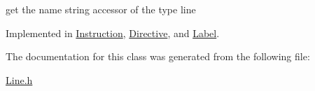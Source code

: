 get the name string accessor of the type line 



Implemented in \hyperlink{class_instruction_aed87de5e9259f4f15dc885425528f1fe}{Instruction}, \hyperlink{class_directive_a2fd56d5580ad7a993782649d7867732f}{Directive}, and \hyperlink{class_label_a6df2e96366cc459a6a8fa9642a6e69b6}{Label}.



The documentation for this class was generated from the following file\+:\begin{DoxyCompactItemize}
\item 
\hyperlink{_line_8h}{Line.\+h}\end{DoxyCompactItemize}
